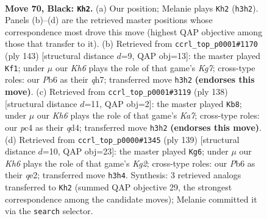 \documentclass[11pt]{article}
\begin{document}
\clearpage

\begin{figure}[p]\centering
\begin{subfigure}{0.46\textwidth}\centering
\resizebox{\linewidth}{!}{%
\newchessgame
\chessboard[
  setfen={8/8/pp6/8/q1P5/3K3k/8/8 b - - 9 70},
  showmover=false,
  pgfstyle=straightmove, color=movearrow, markmove={h3-h2}
]}
\caption{}
\end{subfigure}\hfill
\begin{subfigure}{0.46\textwidth}\centering
\resizebox{\linewidth}{!}{%
\newchessgame
\chessboard[
  setfen={8/7Q/1K6/p7/8/1Pq5/6k1/8 b - - 3 72},
  showmover=false,
  pgfstyle=straightmove, color=movearrow, markmove={g2-f1}
]}
\caption{}
\end{subfigure}
\\[4pt]
\begin{subfigure}{0.46\textwidth}\centering
\resizebox{\linewidth}{!}{%
\newchessgame
\chessboard[
  setfen={8/K7/8/P7/3q4/Q4p2/8/5k2 w - - 6 70},
  showmover=false,
  pgfstyle=straightmove, color=movearrow, markmove={a7-b8}
]}
\caption{}
\end{subfigure}\hfill
\begin{subfigure}{0.46\textwidth}\centering
\resizebox{\linewidth}{!}{%
\newchessgame
\chessboard[
  setfen={8/6k1/8/8/5q1p/8/4QPK1/8 b - - 7 70},
  showmover=false,
  pgfstyle=straightmove, color=movearrow, markmove={g7-g6}
]}
\caption{}
\end{subfigure}
\caption{\textbf{Move 70, Black: \texttt{Kh2}.} (a) Our position; Melanie plays \texttt{Kh2} (\texttt{h3h2}). Panels (b)--(d) are the retrieved master positions whose correspondence most drove this move (highest QAP objective among those that transfer to it). (b) Retrieved from \texttt{ccrl\_top\_p0001\#1170} (ply 143) [structural distance $d$=9, QAP obj=13]: the master played \texttt{Kf1}; under $\mu$ our \emph{Kh6} plays the role of that game's \emph{Kg7}; cross-type roles: our \emph{P}b6 as their \emph{q}h7; transferred move \texttt{h3h2} \textbf{(endorses this move)}. (c) Retrieved from \texttt{ccrl\_top\_p0001\#3119} (ply 138) [structural distance $d$=11, QAP obj=2]: the master played \texttt{Kb8}; under $\mu$ our \emph{Kh6} plays the role of that game's \emph{Ka7}; cross-type roles: our \emph{p}c4 as their \emph{q}d4; transferred move \texttt{h3h2} \textbf{(endorses this move)}. (d) Retrieved from \texttt{ccrl\_top\_p0000\#1345} (ply 139) [structural distance $d$=10, QAP obj=23]: the master played \texttt{Kg6}; under $\mu$ our \emph{Kh6} plays the role of that game's \emph{Kg2}; cross-type roles: our \emph{P}b6 as their \emph{q}e2; transferred move \texttt{h3h4}. Synthesis: 3 retrieved analogs transferred to \texttt{Kh2} (summed QAP objective 29, the strongest correspondence among the candidate moves); Melanie committed it via the \texttt{search} selector.}
\label{fig:thought-m139}
\end{figure}
\end{document}
